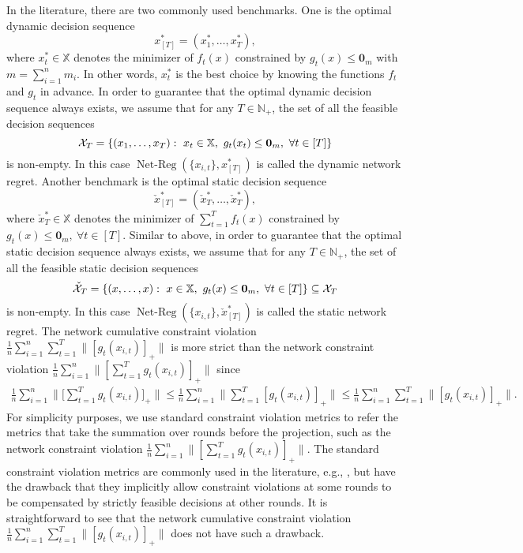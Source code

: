 \documentclass[12pt,draftcls,onecolumn]{IEEEtran}%
\DeclareMathOperator{\NetReg}{Net-Reg}
\begin{document}
In the literature, there are two commonly used benchmarks. One is the optimal dynamic decision sequence $$x_{[T]}^*=(x^*_{1},\dots,x^*_{T}),$$ where $x_t^*\in\mathbb{X}$ denotes the minimizer of $f_t(x)$ constrained by $g_t(x)\le{\bm 0}_{m}$ with $m=\sum_{i=1}^{n}m_i$. In other words, $x_t^*$ is the best choice by knowing the functions $f_{t}$ and $g_{t}$ in advance.
In order to guarantee that the optimal dynamic decision sequence always exists, we assume that for any $T\in\mathbb{N}_+$, the set of all the feasible decision sequences
$$
\mathcal{X}_{T}=\{(x_1,\dots,x_T):~x_t\in \mathbb{X},~g_{t}(x_t)\le{\bf0}_{m},~
\forall t\in[T]\}
$$ is non-empty. In this case $\NetReg(\{x_{i,t}\},x_{[T]}^*)$ is called the dynamic network regret. Another benchmark is the optimal static decision sequence $$\check{x}^*_{[T]}=(\check{x}^*_T,\dots,\check{x}^*_T),$$ where $\check{x}^*_T\in\mathbb{X}$ denotes the minimizer of $\sum_{t=1}^{T}f_t(x)$ constrained by $g_t(x)\le{\bm 0}_{m},~\forall t\in[T]$.
Similar to above, in order to guarantee that the optimal static decision sequence always exists, we assume that for any $T\in\mathbb{N}_+$, the set of all the feasible static decision sequences
$$\check{{\mathcal{X}}}_{T}=\{(x,\dots,x):~x\in \mathbb{X},~g_{t}(x)\le{\bf0}_{m},~\forall t\in[T]\}\subseteq{\mathcal{X}}_{T}$$ is non-empty.
In this case $\NetReg(\{x_{i,t}\},\check{x}^*_{[T]})$ is called the static network regret. 
The network cumulative constraint violation $\frac{1}{n}\sum_{i=1}^n\sum_{t=1}^T\|[g_{t}(x_{i,t})]_+\|$ is more strict than the network constraint violation $\frac{1}{n}\sum_{i=1}^n\|[\sum_{t=1}^Tg_{t}(x_{i,t})]_+\|$ since
\begin{align*}
	\frac{1}{n}\sum_{i=1}^n\Big\|\Big[\sum_{t=1}^Tg_{t}(x_{i,t})\Big]_+\Big\|
	\le\frac{1}{n}\sum_{i=1}^n\Big\|\sum_{t=1}^T[g_{t}(x_{i,t})]_+\Big\|
	\le\frac{1}{n}\sum_{i=1}^n\sum_{t=1}^T\|[g_{t}(x_{i,t})]_+\|.
\end{align*}
For simplicity purposes, we use standard constraint violation metrics to refer the metrics that take the summation over rounds before the projection, such as the network constraint violation $\frac{1}{n}\sum_{i=1}^n\|[\sum_{t=1}^Tg_{t}(x_{i,t})]_+\|$.
The standard constraint violation metrics are commonly used in the literature, e.g., \cite{mahdavi2012trading,jenatton2016adaptive,sun2017safety,chen2017online,
	neely2017online,yu2017online,chen2018heterogeneous,chen2018bandit,cao2019online,
	yuan2017adaptive,sharma2020distributed}, but have the drawback that they implicitly allow constraint violations at some rounds to be compensated by strictly feasible decisions at other rounds. It is straightforward to see that the network cumulative constraint violation $\frac{1}{n}\sum_{i=1}^n\sum_{t=1}^T\|[g_{t}(x_{i,t})]_+\|$ does not have such a drawback.
\end{document}
